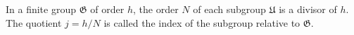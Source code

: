 In a finite group $\mathfrak{G}$ of order $h$, the order $N$ of each subgroup $\mathfrak{U}$ is a divisor of $h$. The quotient $j = h/N$ is called the index of the subgroup relative to $\mathfrak{G}$.
